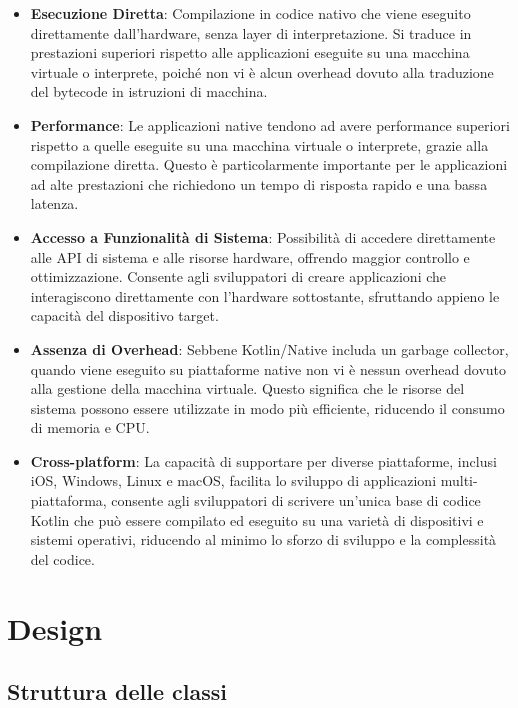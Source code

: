 \documentclass[12pt,a4paper,openright,twoside]{book}
\begin{document}
\begin{itemize}
\item \textbf{Esecuzione Diretta}: Compilazione in codice nativo che viene eseguito direttamente dall'hardware, senza layer di interpretazione. 
Si traduce in prestazioni superiori rispetto alle applicazioni eseguite su una macchina virtuale o interprete, poiché non vi è alcun overhead dovuto alla traduzione 
del bytecode in istruzioni di macchina.
\item \textbf{Performance}: Le applicazioni native tendono ad avere performance superiori rispetto a quelle eseguite su una macchina virtuale o interprete, 
grazie alla compilazione diretta. Questo è particolarmente importante per le applicazioni ad alte prestazioni che richiedono un tempo di risposta rapido e una bassa latenza.
\item \textbf{Accesso a Funzionalità di Sistema}: Possibilità di accedere direttamente alle API di sistema e alle risorse hardware, offrendo maggior controllo e ottimizzazione. 
Consente agli sviluppatori di creare applicazioni che interagiscono direttamente con l'hardware sottostante, sfruttando appieno le capacità del dispositivo target.
\item \textbf{Assenza di Overhead}: Sebbene Kotlin/Native includa un garbage collector, quando viene eseguito su piattaforme native non vi è nessun overhead dovuto alla 
gestione della macchina virtuale. Questo significa che le risorse del sistema possono essere utilizzate in modo più efficiente, riducendo il consumo di memoria e CPU.
\item \textbf{Cross-platform}: La capacità di supportare per diverse piattaforme, inclusi iOS, Windows, Linux e macOS, facilita lo sviluppo di applicazioni multi-piattaforma, 
consente agli sviluppatori di scrivere un'unica base di codice Kotlin che può essere compilato ed eseguito su una varietà di dispositivi e sistemi operativi, 
riducendo al minimo lo sforzo di sviluppo e la complessità del codice.
\end{itemize}

\chapter{Design}\label{chap:Design}

\section{Struttura delle classi}
\end{document}
